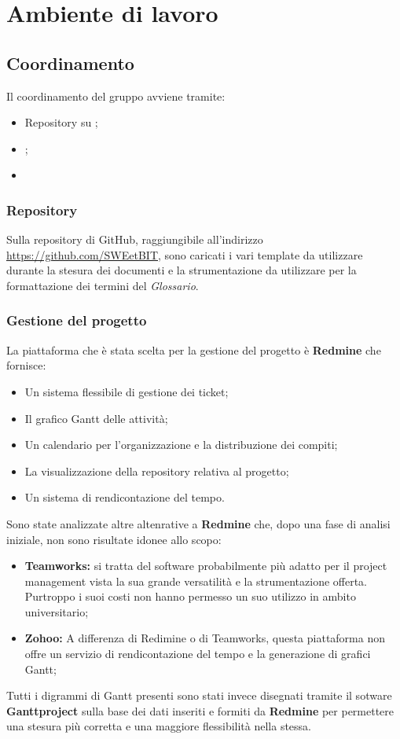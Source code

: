 \section{Ambiente di lavoro}
  \subsection{Coordinamento}
    Il coordinamento del gruppo avviene tramite:
    \begin{itemize}
      \item Repository su ;
      \item {};
      \item {}
    \end{itemize}
    \subsubsection{Repository}
      Sulla repository di GitHub, raggiungibile all'indirizzo \url{https://github.com/SWEetBIT}, sono caricati i vari template da utilizzare
      durante la stesura dei documenti e la strumentazione da utilizzare per la formattazione dei termini del \emph{Glossario}.
    \subsubsection{Gestione del progetto}
      La piattaforma che è stata scelta per la gestione del progetto è \textbf{Redmine} che fornisce:
      \begin{itemize}
        \item Un sistema flessibile di gestione dei ticket;
        \item Il grafico Gantt delle attività;
        \item Un calendario per l'organizzazione e la distribuzione dei compiti;
        \item La visualizzazione della repository relativa al progetto;
        \item Un sistema di rendicontazione del tempo.
      \end{itemize}
      Sono state analizzate altre altenrative a \textbf{Redmine} che, dopo una fase di analisi iniziale, non sono risultate idonee allo scopo:
      \begin{itemize}
        \item \textbf{Teamworks: }si tratta del software probabilmente più adatto per il project management vista la sua grande versatilità e
        la strumentazione offerta. Purtroppo i suoi costi non hanno permesso un suo utilizzo in ambito universitario;
        \item \textbf{Zohoo: }A differenza di Redimine o di Teamworks, questa piattaforma non offre un servizio di rendicontazione del tempo
        e la generazione di grafici Gantt;
      \end{itemize}
      Tutti i digrammi di Gantt presenti sono stati invece disegnati tramite il sotware \textbf{Ganttproject} sulla base dei dati inseriti e formiti da \textbf{Redmine}
      per permettere una stesura più corretta e una maggiore flessibilità nella stessa.
